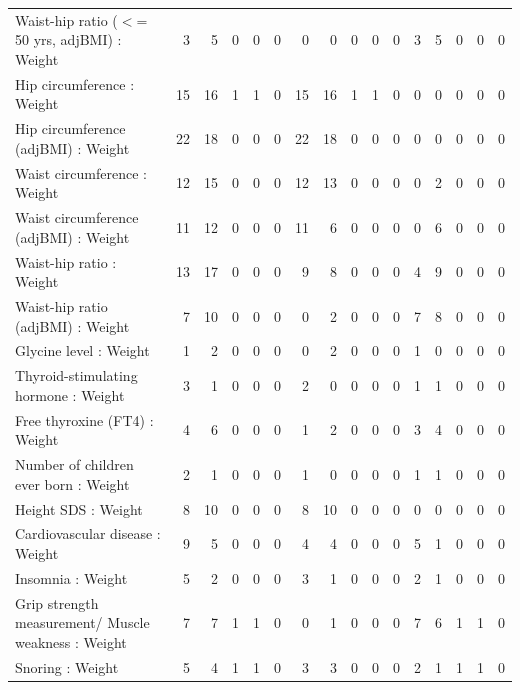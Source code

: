 \begin{table}[ht]
\begin{tabular}{lrrrrrrrrrrrrrrr}
  Waist-hip ratio ($<$= 50 yrs, adjBMI) : Weight  &   3 &   5 &   0 &   0 &   0 &   0 &   0 &   0 &   0 &   0 &   3 &   5 &   0 &   0 &   0 \\ 
  Hip circumference  : Weight  &  15 &  16 &   1 &   1 &   0 &  15 &  16 &   1 &   1 &   0 &   0 &   0 &   0 &   0 &   0 \\ 
  Hip circumference (adjBMI) : Weight  &  22 &  18 &   0 &   0 &   0 &  22 &  18 &   0 &   0 &   0 &   0 &   0 &   0 &   0 &   0 \\ 
  Waist circumference  : Weight  &  12 &  15 &   0 &   0 &   0 &  12 &  13 &   0 &   0 &   0 &   0 &   2 &   0 &   0 &   0 \\ 
  Waist circumference (adjBMI) : Weight  &  11 &  12 &   0 &   0 &   0 &  11 &   6 &   0 &   0 &   0 &   0 &   6 &   0 &   0 &   0 \\ 
  Waist-hip ratio  : Weight  &  13 &  17 &   0 &   0 &   0 &   9 &   8 &   0 &   0 &   0 &   4 &   9 &   0 &   0 &   0 \\ 
  Waist-hip ratio (adjBMI) : Weight  &   7 &  10 &   0 &   0 &   0 &   0 &   2 &   0 &   0 &   0 &   7 &   8 &   0 &   0 &   0 \\ 
  Glycine level  : Weight  &   1 &   2 &   0 &   0 &   0 &   0 &   2 &   0 &   0 &   0 &   1 &   0 &   0 &   0 &   0 \\ 
  Thyroid-stimulating hormone  : Weight  &   3 &   1 &   0 &   0 &   0 &   2 &   0 &   0 &   0 &   0 &   1 &   1 &   0 &   0 &   0 \\ 
  Free thyroxine (FT4) : Weight  &   4 &   6 &   0 &   0 &   0 &   1 &   2 &   0 &   0 &   0 &   3 &   4 &   0 &   0 &   0 \\ 
  Number of children ever born  : Weight  &   2 &   1 &   0 &   0 &   0 &   1 &   0 &   0 &   0 &   0 &   1 &   1 &   0 &   0 &   0 \\ 
  Height SDS : Weight  &   8 &  10 &   0 &   0 &   0 &   8 &  10 &   0 &   0 &   0 &   0 &   0 &   0 &   0 &   0 \\ 
  Cardiovascular disease : Weight  &   9 &   5 &   0 &   0 &   0 &   4 &   4 &   0 &   0 &   0 &   5 &   1 &   0 &   0 &   0 \\ 
  Insomnia : Weight  &   5 &   2 &   0 &   0 &   0 &   3 &   1 &   0 &   0 &   0 &   2 &   1 &   0 &   0 &   0 \\ 
  Grip strength measurement/ Muscle weakness : Weight  &   7 &   7 &   1 &   1 &   0 &   0 &   1 &   0 &   0 &   0 &   7 &   6 &   1 &   1 &   0 \\ 
  Snoring : Weight  &   5 &   4 &   1 &   1 &   0 &   3 &   3 &   0 &   0 &   0 &   2 &   1 &   1 &   1 &   0 \\ 

\end{tabular}
\end{table}
